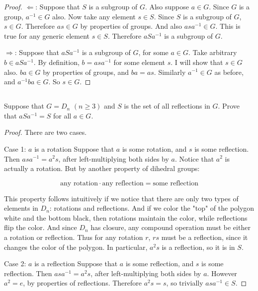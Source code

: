 \documentclass[a4paper,12pt]{article}
\begin{document}
\begin{proof}
$\Leftarrow$: Suppose that $S$ is a subgroup of $G$. Also suppose $a \in G$. Since $G$ is a group, $a^{-1} \in G$ also. Now take any element $s \in S$. Since $S$ is a subgroup of $G$, $s \in G$. Therefore $as \in G$ by properties of groups. And also $asa^{-1} \in G$. This is true for any generic element $s \in S$. Therefore $aSa^{-1}$ is a subgroup of $G$.

$\Rightarrow$: Suppose that $aSa^{-1}$ is a subgroup of $G$, for some $a \in G$. Take arbitrary $b \in aSa^{-1}$. By definition, $b = asa^{-1}$ for some element $s$. I will show that $s \in G$ also. $ba \in G$ by properties of groups, and $ba = as$. Similarly $a^{-1} \in G$ as before, and $a^{-1}ba \in G$. So $s \in G$.
\end{proof}

\subsection{}

Suppose that $G = D_n$ $(n \geq 3)$ and $S$ is the set of all reflections in $G$. Prove that
$aSa^{-1} = S$ for all $a \in G$.

\begin{proof}
There are two cases.

Case 1: $a$ is a rotation
Suppose that $a$ is some rotation, and $s$ is some reflection. Then $asa^{-1} = a^2s$, after left-multiplying both sides by $a$. Notice that $a^2$ is actually a rotation. But by another property of dihedral groups:

\begin{equation*}
\text{any rotation} \cdot \text{any reflection} = \text{some reflection}
\end{equation*}

This property follows intuitively if we notice that there are only two types of elements in $D_n$: rotations and reflections. And if we color the "top" of the polygon white and the bottom black, then rotations maintain the color, while reflections flip the color. And since $D_n$ has closure, any compound operation must be either a rotation or reflection. Thus for any rotation $r$, $rs$ must be a reflection, since it changes the color of the polygon. In particular, $a^2s$ is a reflection, so it is in $S$.

Case 2: $a$ is a reflection
Suppose that $a$ is some reflection, and $s$ is some reflection. Then $asa^{-1} = a^2s$, after left-multiplying both sides by $a$. However $a^2 = e$, by properties of reflections. Therefore $a^2s = s$, so trivially $asa^{-1} \in S$. 
\end{proof}
\end{document}
